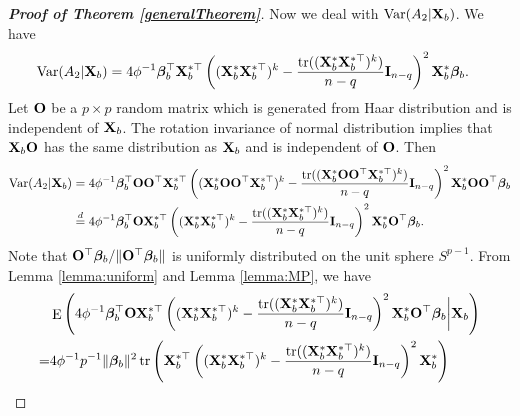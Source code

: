 \documentclass[11pt]{article}
\DeclareMathOperator{\mytr}{tr}
\DeclareMathOperator{\myE}{E}
\DeclareMathOperator{\myVar}{Var}
\newcommand{\bfsym}[1]{\ensuremath{\boldsymbol{#1}}}
\def\bbeta{\bfsym \beta}
\theoremstyle{plain}
\theoremstyle{definition}
\theoremstyle{remark}
\begin{document}
\begin{appendices}
\begin{proof}[\textbf{Proof of Theorem \ref{generalTheorem}}]
Now we deal with $\myVar (A_2 |\BX_b)$.
We have
\begin{align*}
                \myVar (A_2|\BX_b)&= 
                4 \phi^{-1} \bbeta_b^\top \BX_b^{*\top}
                \left( (\BX_b^* \BX_b^{*\top})^{k} 
                    -\frac{\mytr ( (\BX_b^* \BX_b^{*\top})^{k})}{n-q} 
                \BI_{n-q}
            \right)^2  \BX_b^* \bbeta_b
            .
\end{align*}
Let $\mathbf{O}$ be a $p\times p$ random matrix  which is generated from Haar distribution and is independent of $\mathbf{X}_b$.
The rotation invariance of normal distribution implies that $\mathbf{X}_b\mathbf{O}$ has the same distribution as $\mathbf{X}_b$ and is independent of $\mathbf{O}$.
Then
\begin{equation*}
    \begin{split}
    \myVar (A_2 |\BX_b)
    &=
    4\phi^{-1} \bbeta_b^\top \BO \BO^\top  \BX_b^{*\top}
                \left( (\BX_b^* \BO \BO^\top \BX_b^{*\top})^{k} 
                    -\frac{\mytr ( (\BX_b^* \BO \BO^\top  \BX_b^{*\top})^{k})}{n-q} 
                \BI_{n-q}
            \right)^2  \BX_b^* \BO \BO^\top  \bbeta_b
            \\
            &\overset{d}{=}
            4\phi^{-1} \bbeta_b^\top \BO  \BX_b^{*\top}
                \left( (\BX_b^*  \BX_b^{*\top})^{k} 
                    -\frac{\mytr ( (\BX_b^*  \BX_b^{*\top})^{k})}{n-q} 
                \BI_{n-q}
            \right)^2  \BX_b^* \BO^\top  \bbeta_b.
    \end{split}
\end{equation*}
Note that $\BO^\top \bbeta_b/\|\BO^\top \bbeta_b\|$ is uniformly distributed on the unit sphere $S^{p-1}$.
From Lemma \ref{lemma:uniform} and Lemma \ref{lemma:MP}, we have
\begin{equation*}
    \begin{split}
        &
                \myE\left(
                    4\phi^{-1} \bbeta_b^\top \BO  \BX_b^{*\top}
                    \left( (\BX_b^*  \BX_b^{*\top})^{k} 
                        -\frac{\mytr ( (\BX_b^*  \BX_b^{*\top})^{k})}{n-q} 
                \BI_{n-q}
            \right)^2  \BX_b^* \BO^\top  \bbeta_b
            \bigg| \BX_b
        \right)
        \\
        =&
        4\phi^{-1} p^{-1}\|\bbeta_b\|^2
        \mytr \left(  \BX_b^{*\top}
            \left( (\BX_b^*  \BX_b^{*\top})^{k} 
                -\frac{\mytr ( (\BX_b^*  \BX_b^{*\top})^{k})}{n-q} 
                \BI_{n-q}
            \right)^2  \BX_b^* 
\right)
\\

\end{split}
\end{equation*}
\end{proof}
\end{appendices}
\end{document}
